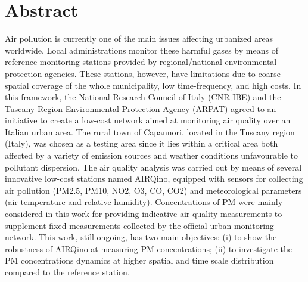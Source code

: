 \chapter{Abstract}\label{ch:abstract}
Air pollution is currently one of the main issues affecting urbanized areas worldwide. Local administrations monitor these harmful gases by means of reference monitoring stations provided by regional/national environmental protection agencies. These stations, however, have limitations due to coarse spatial coverage of the whole municipality, low time-frequency, and high costs. In this framework, the National Research Council of Italy (CNR-IBE) and the Tuscany Region Environmental Protection Agency (ARPAT) agreed to an initiative to create a low-cost network aimed at monitoring air quality over an Italian urban area. The rural town of Capannori, located in the Tuscany region (Italy), was chosen as a testing area since it lies within a critical area both affected by a variety of emission sources and weather conditions unfavourable to pollutant dispersion. The air quality analysis was carried out by means of several innovative low-cost stations named AIRQino, equipped with sensors for collecting air pollution (PM2.5, PM10, NO2, O3, CO, CO2) and meteorological parameters (air temperature and relative humidity). Concentrations of PM were mainly considered in this work for providing indicative air quality measurements to supplement fixed measurements collected by the official urban monitoring network. This work, still ongoing, has two main objectives: (i) to show the robustness of AIRQino at measuring PM concentrations; (ii) to investigate the PM concentrations dynamics at higher spatial and time scale distribution compared to the reference station.
